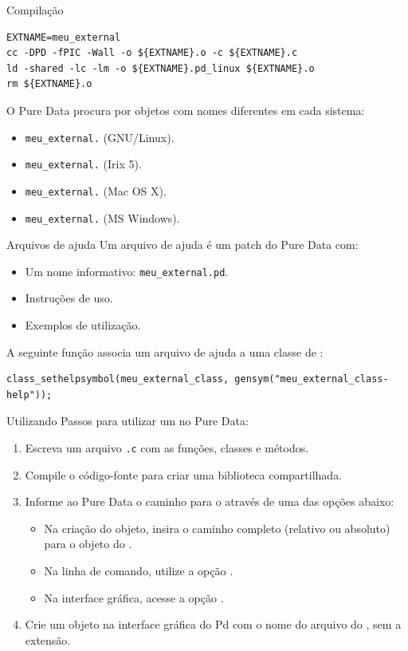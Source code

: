 \begin{frame}[fragile]{Compilação}
\begin{lstlisting}
EXTNAME=meu_external
cc -DPD -fPIC -Wall -o ${EXTNAME}.o -c ${EXTNAME}.c
ld -shared -lc -lm -o ${EXTNAME}.pd_linux ${EXTNAME}.o
rm ${EXTNAME}.o
\end{lstlisting}
O Pure Data procura por objetos com nomes diferentes em cada sistema:
\begin{itemize}
  \item \texttt{meu\_external.} (GNU/Linux).
  \item \texttt{meu\_external.} (Irix 5).
  \item \texttt{meu\_external.} (Mac OS X).
  \item \texttt{meu\_external.} (MS Windows).
\end{itemize}
\end{frame}


\begin{frame}[fragile]{Arquivos de ajuda}
Um arquivo de ajuda é um patch do Pure Data com:
\begin{itemize}
\item Um nome informativo: \texttt{meu\_external.pd}.
\item Instruções de uso.
\item Exemplos de utilização.
\end{itemize}
\vspace{2em}
A seguinte função associa um arquivo de ajuda a uma classe de \external:
\begin{lstlisting}
class_sethelpsymbol(meu_external_class, gensym("meu_external_class-help"));
\end{lstlisting}
\end{frame}


\begin{frame}{Utilizando \externals}
Passos para utilizar um \external no Pure Data:
\begin{enumerate}
\item Escreva um arquivo \texttt{.c} com as funções, classes e métodos.
\item Compile o código-fonte para criar uma biblioteca compartilhada.
\item Informe ao Pure Data o caminho para o \external através de uma das
opções abaixo:
  \begin{itemize}
    \item Na criação do objeto, insira o caminho completo (relativo ou
    absoluto) para o objeto do \external.
    \item Na linha de comando, utilize a opção .
    \item Na interface gráfica, acesse a opção .
  \end{itemize}
\item Crie um objeto na interface gráfica do Pd com o nome do arquivo do \external, sem a extensão.
\end{enumerate}
\end{frame}


